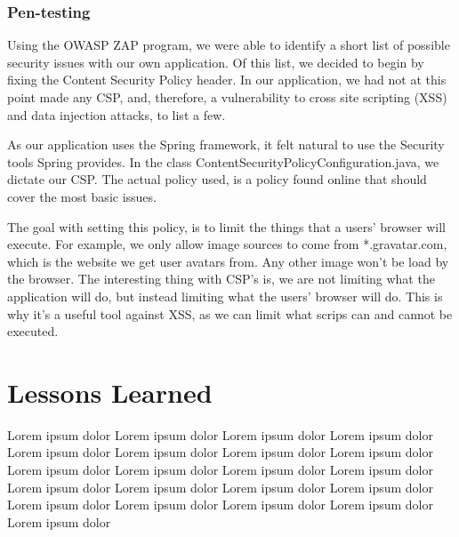 \documentclass{article}
\begin{document}
\subsubsection{\Large Pen-testing}

Using the OWASP ZAP program, we were able to identify a short list of possible security issues with our own application. Of this list, we decided to begin by fixing the Content Security Policy header. In our application, we had not at this point made any CSP, and, therefore, a vulnerability to cross site scripting (XSS) and data injection attacks, to list a few.

As our application uses the Spring framework, it felt natural to use the Security tools Spring provides. In the class ContentSecurityPolicyConfiguration.java, we dictate our CSP. The actual policy used, is a policy found online that should cover the most basic issues.

The goal with setting this policy, is to limit the things that a users' browser will execute. For example, we only allow image sources to come from *.gravatar.com, which is the website we get user avatars from. Any other image won't be load by the browser. The interesting thing with CSP's is, we are not limiting what the application will do, but instead limiting what the users' browser will do. This is why it's a useful tool against XSS, as we can limit what scrips can and cannot be executed.

\section{Lessons Learned}
Lorem ipsum dolor Lorem ipsum dolor Lorem ipsum dolor Lorem ipsum dolor Lorem ipsum dolor Lorem ipsum dolor Lorem ipsum dolor Lorem ipsum dolor Lorem ipsum dolor Lorem ipsum dolor Lorem ipsum dolor Lorem ipsum dolor Lorem ipsum dolor Lorem ipsum dolor Lorem ipsum dolor Lorem ipsum dolor Lorem ipsum dolor Lorem ipsum dolor Lorem ipsum dolor Lorem ipsum dolor Lorem ipsum dolor 




\end{document}
